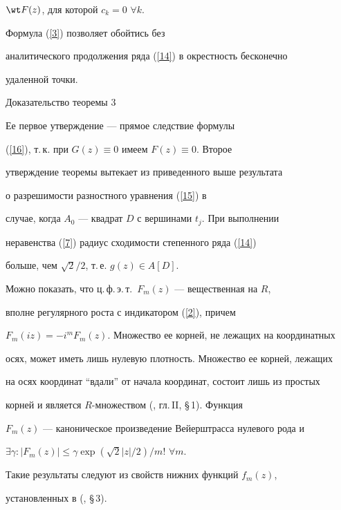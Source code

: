 $\wt F(z)$, для которой $c_k=0$\; $\forall k$.





Формула (\ref{3}) позволяет обойтись без


аналитического продолжения ряда (\ref{14}) в окрестность бесконечно


удаленной точки.








\begin{pf*}{Доказательство теоремы 3}


Ее первое утверждение --- прямое следствие формулы


(\ref{16}), т.\,к. при $G(z)\equiv 0$ имеем $F(z)\equiv 0$. Второе


утверждение теоремы вытекает из приведенного выше результата 


\cite{Avtor1} о разрешимости разностного уравнения (\ref{15}) в


случае, когда $A_0$ --- квадрат $D$ с вершинами $t_j$. При выполнении


неравенства (\ref{7}) радиус сходимости степенного ряда (\ref{14})


больше, чем $\sqrt2/2$, т.\,е. $g(z)\in A[D]$.


\end{pf*}





\begin{note}


Можно показать, что ц.\,ф.\,э.\,т.\ $F_m(z)$ --- вещественная на $R$,


вполне регулярного роста с индикатором (\ref{2}), причем


$F_m(iz)=-i^mF_m(z)$. Множество ее корней, не лежащих на координатных


осях, может иметь лишь нулевую плотность. Множество ее корней, лежащих


на осях координат ``вдали'' от начала координат, состоит лишь из простых


корней и является $R$-множеством (\cite{Levin}, гл.\,II, \S\,1). Функция


$F_m(z)$ --- каноническое произведение Вейерштрасса нулевого рода и


$\exists\gamma :|F_m(z)|\le\gamma\exp(\sqrt2|z|/2)/m!$\; $\forall m$.


Такие результаты следуют из свойств нижних функций $f_m(z)$,


установленных в (\cite{Avtor1}, \S\,3).


\end{note}





